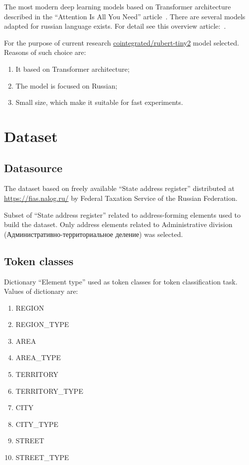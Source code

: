 \documentclass{article}
\begin{document}
The most modern deep learning models based on Transformer architecture described in the ``Attention Is All You Need'' article~\cite{vaswani2023attention}.
There are several models adapted for russian language exists.
For detail see this overview article:~\cite{zmitrovich2024family}.

For the purpose of current research \href{https://huggingface.co/cointegrated/rubert-tiny2}{cointegrated/rubert-tiny2} model selected.
Reasons of such choice are:
\begin{enumerate}
    \item It based on Transformer architecture;
    \item The model is focused on Russian;
    \item Small size, which make it suitable for fast experiments.
\end{enumerate}


\section{Dataset}

\subsection{Datasource}
The dataset based on freely available ``State address register'' distributed at \url{https://fias.nalog.ru/} by Federal Taxation Service of the Russian Federation.

Subset of ``State address register'' related to address-forming elements used to build the dataset.
Only address elements related to Administrative division (Административно-территориальное деление) was selected.

\subsection{Token classes}

Dictionary ``Element type'' used as token classes for token classification task.
Values of dictionary are:
\begin{enumerate}
    \item REGION
    \item REGION\_TYPE
    \item AREA
    \item AREA\_TYPE
    \item TERRITORY
    \item TERRITORY\_TYPE
    \item CITY
    \item CITY\_TYPE
    \item STREET
    \item STREET\_TYPE
\end{enumerate}
\end{document}
